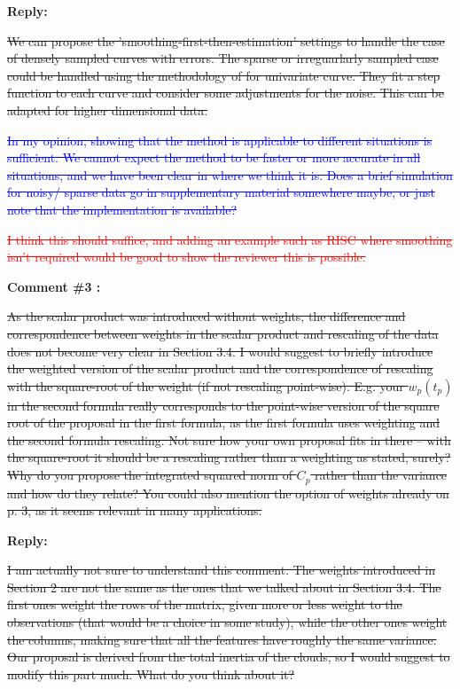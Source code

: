 \documentclass[11pt]{article}
\begin{document}
\medskip

\normalfont

\textbf{Reply:}

\sout{We can propose the 'smoothing-first-then-estimation' settings to handle the  case of densely sampled curves with errors. The sparse or irreguarlarly sampled case could be handled using the methodology of \cite{benkoCommonFunctionalPrincipal2009} for univariate curve. They fit a step function to each curve and consider some adjustments for the noise. This can be adapted for higher dimensional data.}

\textcolor{blue}{\sout{In my opinion, showing that the method is applicable to different situations is sufficient. We cannot expect the method to be faster or more accurate in all situations, and we have been clear in where we think it is. Does a brief simulation for noisy/ sparse data go in supplementary material somewhere maybe, or just note that the implementation is available?}}

\textcolor{red}{\sout{I think this should suffice, and adding an example such as RISC where smoothing isn't required would be good to show the reviewer this is possible.}}

\bigskip

\itshape


\textbf{Comment \#3 :}

\sout{As the scalar product was introduced without weights, the difference and correspondence between weights in the scalar product and rescaling of the data does not become very clear in Section 3.4. I would suggest to briefly introduce the weighted version of the scalar product and the correspondence of rescaling with the square-root of the weight (if not rescaling point-wise). E.g. your $w_p(t_p)$ in the second formula really corresponds to the point-wise version of the square root of the proposal in the first formula, as the first formula uses weighting and the second formula rescaling. Not sure how your own proposal fits in there – with the square-root it should be a rescaling rather than a weighting as stated, surely? Why do you propose the integrated squared norm of $C_p$ rather than the variance and how do they relate? You could also mention the option of weights already on p. 3, as it seems relevant in many applications.}

\medskip

\normalfont

\textbf{Reply:}

\sout{I am actually not sure to understand this comment. The weights introduced in Section 2 are not the same as the ones that we talked about in Section 3.4. The first ones weight the rows of the matrix, given more or less weight to the observations (that would be a choice in some study), while the other ones weight the columns, making sure that all the features have roughly the same variance. Our proposal is derived from the total inertia of the clouds, so I would suggest to modify this part much.
What do you think about it?}
\end{document}
